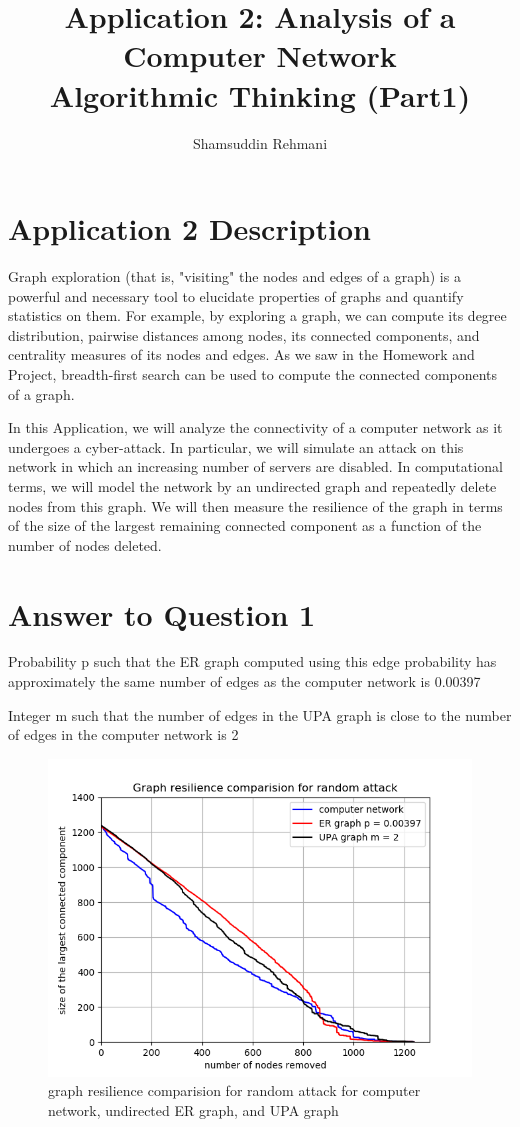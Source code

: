 \documentclass[a4paper]{article}
\title{Application 2: Analysis of a Computer Network \\Algorithmic Thinking (Part1)}
\author{Shamsuddin Rehmani}
\begin{document}
\sloppy
\maketitle
\section*{Application 2 Description}
Graph exploration (that is, "visiting" the nodes and edges of a graph) is a powerful and necessary tool to elucidate properties of graphs and quantify statistics on them. For example, by exploring a graph, we can compute its degree distribution, pairwise distances among nodes, its connected components, and centrality measures of its nodes and edges. As we saw in the Homework and Project, breadth-first search can be used to compute the connected components of a graph.

In this Application, we will analyze the connectivity of a computer network as it undergoes a cyber-attack. In particular, we will simulate an attack on this network in which an increasing number of servers are disabled. In computational terms, we will model the network by an undirected graph and repeatedly delete nodes from this graph. We will then measure the resilience of the graph in terms of the size of the largest remaining connected component as a function of the number of nodes deleted.

\section*{Answer to Question 1}
Probability p such that the ER graph computed using this edge probability has approximately the same number of edges as the computer network is 0.00397

Integer m such that the number of edges in the UPA graph is close to the number of edges in the computer network is 2

\FloatBarrier
\begin{figure}[h]
	\centering 
	\includegraphics[scale = 0.9, clip=True, trim=0cm 0cm 0cm 0cm]{Q1_graph_resilience_comparision.png}
	\caption{graph resilience comparision for random attack for computer network, undirected ER graph, and UPA graph}
\end{figure}
\FloatBarrier
\end{document}
